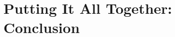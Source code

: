 \documentclass[../main]{subfiles}
\begin{document}
\chapter{Putting It All Together: Conclusion} \label{chp:}








\end{document}
